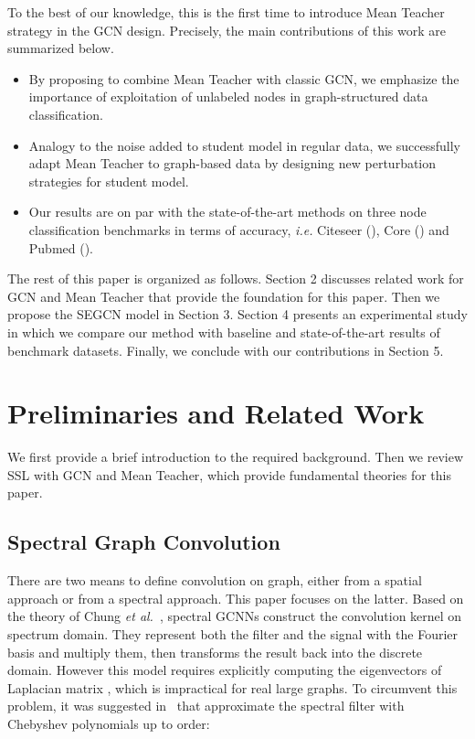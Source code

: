 \documentclass[letterpaper]{article} \usepackage{aaai19}  \usepackage{times}  \usepackage{helvet}  \usepackage{courier}  \usepackage{url}  \usepackage{graphicx}  \usepackage{algorithm}
\begin{document}
To the best of our knowledge, this is the first time to introduce Mean Teacher strategy in the GCN design. Precisely, the main contributions of this work are summarized below. 
\begin{itemize}
\item By proposing to combine Mean Teacher with classic GCN, we emphasize the importance of exploitation of unlabeled nodes in graph-structured data classification.
\item Analogy to the noise added to student model in regular data, we successfully adapt Mean Teacher to graph-based data by designing new perturbation strategies for student model.
\item Our results are on par with the state-of-the-art methods on three node classification benchmarks in terms of accuracy, \emph{i.e.} Citeseer (), Core () and Pubmed ().
\end{itemize}

The rest of this paper is organized as follows. Section 2 discusses related work for GCN and Mean Teacher that provide the foundation for this paper. Then we propose the SEGCN model in Section 3. Section 4 presents an experimental study in which we compare our method with baseline and state-of-the-art results of benchmark datasets. Finally, we conclude with our contributions in Section 5.

\section{Preliminaries and Related Work}
We first provide a brief introduction to the required background. Then we review SSL with GCN and Mean Teacher, which provide fundamental theories for this paper.
\subsection{Spectral Graph Convolution}
There are two means to define convolution on graph, either from a spatial approach or from a spectral approach. This paper focuses on the latter. Based on the theory of Chung \emph{et al.}~\cite{chung1997spectral}, spectral GCNNs construct the convolution kernel on spectrum domain. They represent both the filter and the signal with the Fourier basis and multiply them, then transforms the result back into the discrete domain. However this model requires explicitly computing the eigenvectors of Laplacian matrix , which is impractical for real large graphs. To circumvent this problem, it was suggested in~\cite{hammond2009wavelets} that approximate the spectral filter  with Chebyshev polynomials up to  order:
\end{document}
